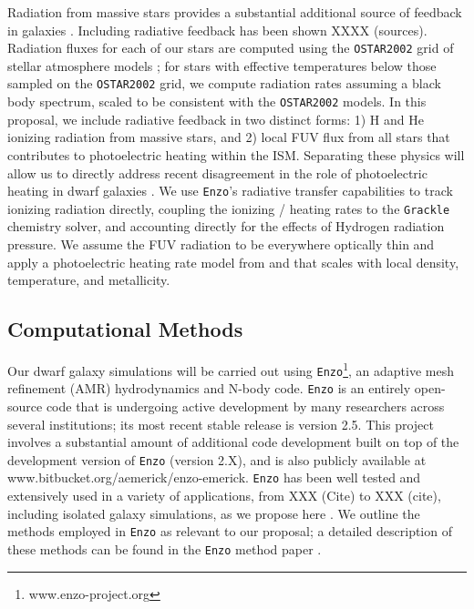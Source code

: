 \documentclass[11pt]{article}
\newcommand{\eg}{e.g.,}
\begin{document}
Radiation from massive stars provides a substantial additional source of feedback in galaxies \citep[\eg][]{Agertz2013}. Including radiative feedback has been shown XXXX (sources). Radiation fluxes for each of our stars are computed using the \texttt{OSTAR2002} grid of stellar atmosphere models \citep{Lanz2003}; for stars with effective temperatures below those sampled on the \texttt{OSTAR2002} grid, we compute radiation rates assuming a black body spectrum, scaled to be consistent with the \texttt{OSTAR2002} models. In this proposal, we include radiative feedback in two distinct forms: 1) H and He ionizing radiation from massive stars, and 2) local FUV flux from all stars that contributes to photoelectric heating within the ISM. Separating these physics will allow us to directly address recent disagreement in the role of photoelectric heating in dwarf galaxies \citep{Hu2016, Forbes2016}. We use \texttt{Enzo}'s radiative transfer capabilities \citep{Wise2012a,WiseAbel2012,Wise2014} to track ionizing radiation directly, coupling the ionizing / heating rates to the \texttt{Grackle} chemistry solver, and accounting directly for the effects of Hydrogen radiation pressure. We assume the FUV radiation to be everywhere optically thin and apply a photoelectric heating rate model from \cite{BakesTielens1994} and \cite{Wolfire2003} that scales with local density, temperature, and metallicity.

\subsection{Computational Methods}

Our dwarf galaxy simulations will be carried out using \texttt{Enzo}\footnote{www.enzo-project.org}, an adaptive mesh refinement (AMR) hydrodynamics and N-body code. \texttt{Enzo} is an entirely open-source code that is undergoing active development by many researchers across several institutions; its most recent stable release is version 2.5. This project involves a substantial amount of additional code development built on top of the development version of \texttt{Enzo} (version 2.X), and is also publicly available at www.bitbucket.org/aemerick/enzo-emerick. \texttt{Enzo} has been well tested and extensively used in a variety of applications, from XXX (Cite) to XXX (cite), including isolated galaxy simulations, as we propose here \citep[\eg][]{Goldbaum2015, Goldbaum2016, Forbes2016}. We outline the methods employed in \texttt{Enzo} as relevant to our proposal; a detailed description of these methods can be found in the \texttt{Enzo} method paper \citep{Enzo2014}. 
\end{document}
